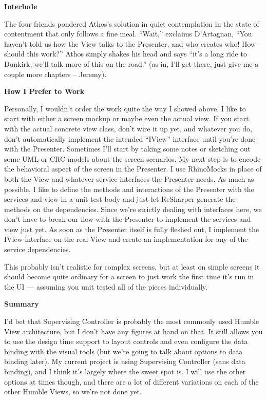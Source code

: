\documentclass{article}
\begin{document}
{ 
\Large {\textbf{Interlude}}

The four friends pondered Athos's solution in quiet contemplation in the state of contentment that only follows a fine meal.  “Wait,” exclaims D'Artagnan, “You haven't told us how the View talks to the Presenter, and who creates who!  How should this work?”  Athos simply shakes his head and says “it's a long ride to Dunkirk, we'll talk more of this on the road.”  (as in, I'll get there, just give me a couple more chapters – Jeremy).

 
\Large {\textbf{How I Prefer to Work}}

Personally, I wouldn't order the work quite the way I showed above.  I like to start with either a screen mockup or maybe even the actual view.  If you start with the actual concrete view class, don't wire it up yet, and whatever you do, don't automatically implement the intended “IView” interface until you're done with the Presenter.  Sometimes I'll start by taking some notes or sketching out some UML or CRC models about the screen scenarios.  My next step is to encode the behavioral aspect of the screen in the Presenter.  I use RhinoMocks in place of both the View and whatever service interfaces the Presenter needs.  As much as possible, I like to define the methods and interactions of the Presenter with the services and view in a unit test body and just let ReSharper generate the methods on the dependencies.  Since we're strictly dealing with interfaces here, we don't have to break our flow with the Presenter to implement the services and view just yet.  As soon as the Presenter itself is fully fleshed out, I implement the IView interface on the real View and create an implementation for any of the service dependencies.

This probably isn't realistic for complex screens, but at least on simple screens it should become quite ordinary for a screen to just work the first time it's run in the UI — assuming you unit tested all of the pieces individually.

 
\Large {\textbf{Summary}}

I'd bet that Supervising Controller is probably the most commonly used Humble View architecture, but I don't have any figures at hand on that.  It still allows you to use the design time support to layout controls and even configure the data binding with the visual tools (but we're going to talk about options to data binding later).  My current project is using Supervising Controller (sans data binding), and I think it's largely where the sweet spot is.  I will use the other options at times though, and there are a lot of different variations on each of the other Humble Views, so we're not done yet.

}
\end{document}
